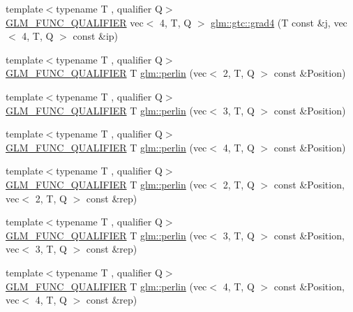 \begin{DoxyCompactItemize}
\item 
{\footnotesize template$<$typename T , qualifier Q$>$ }\\\mbox{\hyperlink{setup_8hpp_a33fdea6f91c5f834105f7415e2a64407}{G\+L\+M\+\_\+\+F\+U\+N\+C\+\_\+\+Q\+U\+A\+L\+I\+F\+I\+ER}} vec$<$ 4, T, Q $>$ \mbox{\hyperlink{namespaceglm_1_1gtc_a3e64854dc3369fadffdc335c55a90fd5}{glm\+::gtc\+::grad4}} (T const \&j, vec$<$ 4, T, Q $>$ const \&ip)
\item 
{\footnotesize template$<$typename T , qualifier Q$>$ }\\\mbox{\hyperlink{setup_8hpp_a33fdea6f91c5f834105f7415e2a64407}{G\+L\+M\+\_\+\+F\+U\+N\+C\+\_\+\+Q\+U\+A\+L\+I\+F\+I\+ER}} T \mbox{\hyperlink{namespaceglm_a54326f7a6c7c00d7702fe6f15fa0d13f}{glm\+::perlin}} (vec$<$ 2, T, Q $>$ const \&Position)
\item 
{\footnotesize template$<$typename T , qualifier Q$>$ }\\\mbox{\hyperlink{setup_8hpp_a33fdea6f91c5f834105f7415e2a64407}{G\+L\+M\+\_\+\+F\+U\+N\+C\+\_\+\+Q\+U\+A\+L\+I\+F\+I\+ER}} T \mbox{\hyperlink{namespaceglm_add5d8345389c307da58e6916d949c4be}{glm\+::perlin}} (vec$<$ 3, T, Q $>$ const \&Position)
\item 
{\footnotesize template$<$typename T , qualifier Q$>$ }\\\mbox{\hyperlink{setup_8hpp_a33fdea6f91c5f834105f7415e2a64407}{G\+L\+M\+\_\+\+F\+U\+N\+C\+\_\+\+Q\+U\+A\+L\+I\+F\+I\+ER}} T \mbox{\hyperlink{namespaceglm_ad9c74f290ab9071e4b3d158d62c7efdf}{glm\+::perlin}} (vec$<$ 4, T, Q $>$ const \&Position)
\item 
{\footnotesize template$<$typename T , qualifier Q$>$ }\\\mbox{\hyperlink{setup_8hpp_a33fdea6f91c5f834105f7415e2a64407}{G\+L\+M\+\_\+\+F\+U\+N\+C\+\_\+\+Q\+U\+A\+L\+I\+F\+I\+ER}} T \mbox{\hyperlink{namespaceglm_aa9d7537f6a631bed7dc89a866590c2b8}{glm\+::perlin}} (vec$<$ 2, T, Q $>$ const \&Position, vec$<$ 2, T, Q $>$ const \&rep)
\item 
{\footnotesize template$<$typename T , qualifier Q$>$ }\\\mbox{\hyperlink{setup_8hpp_a33fdea6f91c5f834105f7415e2a64407}{G\+L\+M\+\_\+\+F\+U\+N\+C\+\_\+\+Q\+U\+A\+L\+I\+F\+I\+ER}} T \mbox{\hyperlink{namespaceglm_aea1a673faff023ed76c5b8a54ee6b1c0}{glm\+::perlin}} (vec$<$ 3, T, Q $>$ const \&Position, vec$<$ 3, T, Q $>$ const \&rep)
\item 
{\footnotesize template$<$typename T , qualifier Q$>$ }\\\mbox{\hyperlink{setup_8hpp_a33fdea6f91c5f834105f7415e2a64407}{G\+L\+M\+\_\+\+F\+U\+N\+C\+\_\+\+Q\+U\+A\+L\+I\+F\+I\+ER}} T \mbox{\hyperlink{namespaceglm_a28583ae399b336a17defb061fba44ce5}{glm\+::perlin}} (vec$<$ 4, T, Q $>$ const \&Position, vec$<$ 4, T, Q $>$ const \&rep)

\end{DoxyCompactItemize}
